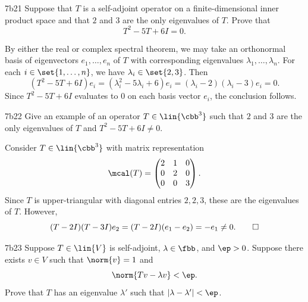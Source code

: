 \begin{exercise}{7b21}
    Suppose that $T$ is a self-adjoint operator on a finite-dimensional inner product space and that $2$ and $3$ are the only eigenvalues of $T$.
    Prove that
    \[
        T^2 - 5T + 6I = 0.
    \]
\end{exercise}

\begin{sol}
    By either the real or complex spectral theorem, we may take an orthonormal basis of eigenvectors $e_1, \ldots, e_n$ of $T$ with corresponding eigenvalues $\lambda_1, \ldots, \lambda_n$.
    For each $i \in \set{1, \ldots, n}$, we have $\lambda_i \in \set{2, 3}$.
    Then
    \[
        (T^2 - 5T + 6I)e_i = (\lambda_i^2 - 5\lambda_i + 6)e_i = (\lambda_i - 2)(\lambda_i - 3)e_i = 0.
    \]
    Since $T^2 - 5T + 6I$ evaluates to $0$ on each basis vector $e_i$, the conclusion follows.
\end{sol}

\begin{exercise}{7b22}
    Give an example of an operator $T \in \lin{\cbb^3}$ such that $2$ and $3$ are the only eigenvalues of $T$ and $T^2 - 5T + 6I \neq 0$.
\end{exercise}

\begin{sol}
    Consider $T \in \lin{\cbb^3}$ with matrix representation
    \[
        \mcal(T) = 
        \begin{pmatrix}
            2 & 1 & 0 \\
            0 & 2 & 0 \\
            0 & 0 & 3
        \end{pmatrix}.
    \]
    Since $T$ is upper-triangular with diagonal entries $2, 2, 3$, these are the eigenvalues of $T$. 
    However,
    \[
        (T - 2I)(T - 3I)e_2 = (T - 2I)(e_1 - e_2) = -e_1 \neq 0. \qedhere
    \]
\end{sol}

\begin{exercise}{7b23}
    Suppose $T \in \lin{V}$ is self-adjoint, $\lambda \in \fbb$, and $\ep > 0$.
    Suppose there exists $v \in V$ such that $\norm{v} = 1$ and
    \[
        \norm{Tv - \lambda v} < \ep.
    \]
    Prove that $T$ has an eigenvalue $\lambda'$ such that $|\lambda - \lambda'| < \ep$.

\end{exercise}

